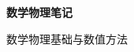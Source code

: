 \begin{titlepage}
    \centering

    \vspace*{5cm} %
    {\Huge \bfseries 数学物理笔记\par}  %
    \vspace{1em}

    {\LARGE 数学物理基础与数值方法\par}  

    \vfill 

\end{titlepage}